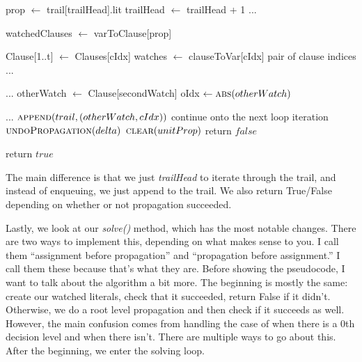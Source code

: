 \begin{algorithm}[H]
\caption{Modified propagate}\label{alg:22}
\begin{algorithmic}[1]

    \State prop $\gets$ trail[trailHead].lit
    \State trailHead $\gets$ trailHead + 1
    \State ...

    \State watchedClauses $\gets$ varToClause[prop]

        \State Clause[1..t] $\gets$ Clauses[cIdx]
        \State watches $\gets$ clauseToVar[cIdx] \Comment pair of clause indices
        \State ...

            \State ...
            \State otherWatch $\gets$ Clause[secondWatch]
            \State oIdx $\gets \Call{abs}{otherWatch}$

                \State ...
                \State $\Call{append}{trail, (otherWatch, cIdx)}$
            \Else
                    \State continue onto the next loop iteration
                \Else 
                    \State $\Call{undoPropagation}{delta}$
                    \State $\Call{clear}{unitProp}$
                    \State return $false$
                \EndIf
            \EndIf
        \EndIf
    \EndFor
\EndWhile

\State return $true$

\EndProcedure
\end{algorithmic}
\end{algorithm}

The main difference is that we just \textit{trailHead} to iterate through the trail, and 
instead of enqueuing, we just append to the trail. We also return True/False depending on 
whether or not propagation succeeded.

Lastly, we look at our \textit{solve()} method, which has the most notable changes.
There are two ways to implement this, depending on what makes sense to you. I call 
them ``assignment before propagation'' and ``propagation before assignment.'' I
call them these because that's what they are. Before showing the pseudocode, I 
want to talk about the algorithm a bit more. The beginning is mostly the same:
create our watched literals, check that it succeeded, return False if it didn't. 
Otherwise, we do a root level propagation and then check if it succeeds as well.
However, the main confusion comes from handling the case of when there is a 
0th decision level and when there isn't. There are multiple ways to go about this.
After the beginning, we enter the solving loop. 

